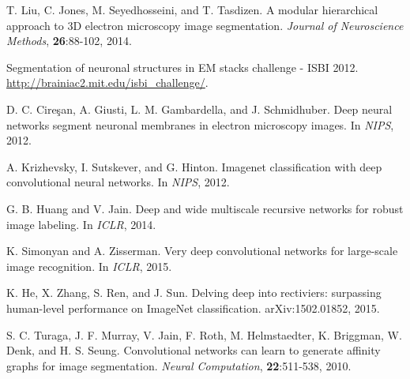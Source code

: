 \documentclass{article} %
\begin{document}
\begin{thebibliography}{9}
{
T. Liu, C. Jones, M. Seyedhosseini, and T. Tasdizen. A modular hierarchical approach to 3D electron microscopy image segmentation. {\it Journal of Neuroscience Methods}, {\bf 26}:88-102, 2014.

Segmentation of neuronal structures in EM stacks challenge - ISBI 2012.
\url{http://brainiac2.mit.edu/isbi_challenge/}.

D. C. Cire\c{s}an, A. Giusti, L. M. Gambardella, and J. Schmidhuber. Deep neural networks segment neuronal membranes in electron microscopy images. In {\it NIPS}, 2012.



A. Krizhevsky, I. Sutskever, and G. Hinton. Imagenet classification with deep convolutional neural networks. In {\it NIPS}, 2012.

G. B. Huang and V. Jain. Deep and wide multiscale recursive networks for robust image labeling. In {\it ICLR}, 2014.

K. Simonyan and A. Zisserman. Very deep convolutional networks for large-scale image recognition. In {\it ICLR}, 2015.

K. He, X. Zhang, S. Ren, and J. Sun. Delving deep into rectiviers: surpassing human-level performance on ImageNet classification. arXiv:1502.01852, 2015.


S. C. Turaga, J. F. Murray, V. Jain, F. Roth, M. Helmstaedter, K. Briggman, W. Denk, and H. S. Seung. Convolutional networks can learn to generate affinity graphs for image segmentation. {\it Neural Computation}, {\bf 22}:511-538, 2010.

}
\end{thebibliography}
\end{document}
